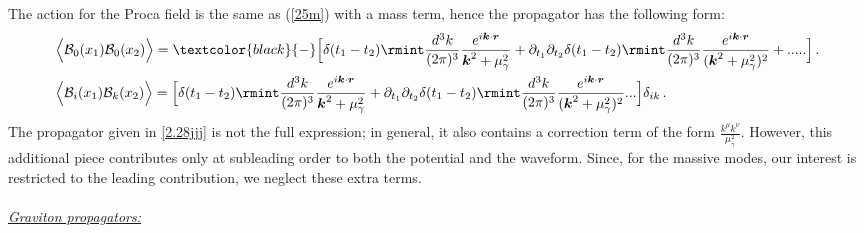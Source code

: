 The action for the Proca field is the same as (\ref{25m}) with a mass term, hence the propagator has the following form:
\begin{align}
    \begin{split}
    &\Big\langle\mathcal{B}_{0}(x_1)\mathcal{B}_0(x_2)\Big\rangle=\textcolor{black}{-}\Big[\delta(t_1-t_2)\rmint \frac{d^3k}{(2\pi)^3}\frac{e^{i\boldsymbol{k}\cdot\boldsymbol{r}}}{\boldsymbol{k}^2+\mu_{\gamma}^2}+\partial_{t_1}\partial_{t_2}\delta(t_1-t_2)\rmint \frac{d^3k}{(2\pi)^3}\frac{e^{i\boldsymbol{k}\cdot\boldsymbol{r}}}{(\boldsymbol{k}^2+\mu_{\gamma}^2)^2}+.....\Big]\,.\\ &
\Big\langle\mathcal{B}_{i}(x_1)\mathcal{B}_k(x_2)\Big\rangle=\Big[\delta(t_1-t_2)\rmint \frac{d^3k}{(2\pi)^3}\frac{e^{i\boldsymbol{k}\cdot\boldsymbol{r}}}{\boldsymbol{k}^2+\mu_{\gamma}^2}+\partial_{t_1}\partial_{t_2}\delta(t_1-t_2)\rmint \frac{d^3k}{(2\pi)^3}\frac{e^{i\boldsymbol{k}\cdot\boldsymbol{r}}}{(\boldsymbol{k}^2+\mu_{\gamma}^2)^2}...\Big]\delta_{ik}\,.\label{2.28jjj}
    \end{split}
\end{align}
The propagator given in \eqref{2.28jjj} is not the full expression; in general, it also contains a correction term of the form \(\frac{k^\mu k^\nu}{\mu_{\gamma}^2}\). However, this additional piece contributes only at subleading order to both the potential and the waveform. Since, for the massive modes, our interest is restricted to the leading contribution, we neglect these extra terms.\\\\
\underline{\textit{Graviton propagators:}}

